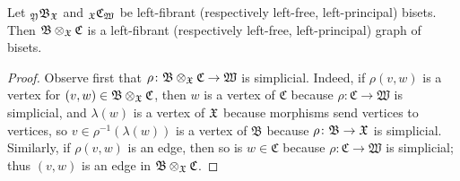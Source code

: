 \documentclass{amsart}
\begin{document}
\begin{lem}\label{lem:ProdOfFibrGrBis}
  Let ${}_{\mathfrak Y}\mathfrak B_{\mathfrak X}$ and
  ${}_{\mathfrak X}\mathfrak C_{\mathfrak W}$ be left-fibrant (respectively
  left-free, left-principal) bisets. Then
  $\mathfrak B\otimes_{\mathfrak X}\mathfrak C$ is a left-fibrant (respectively
  left-free, left-principal) graph of bisets.
\end{lem}
\begin{proof}
  Observe first that
  $\rho\colon \mathfrak B\otimes_{\mathfrak X}\mathfrak C\to \mathfrak W$ is
  simplicial. Indeed, if $\rho(v, w)$ is a vertex for
  $(v,w)\in \mathfrak B\otimes_{\mathfrak X}\mathfrak C$, then $w$ is a vertex
  of $\mathfrak C$ because $\rho\colon \mathfrak C\to \mathfrak W$ is
  simplicial, and $\lambda(w)$ is a vertex of ${\mathfrak X}$ because morphisms
  send vertices to vertices, so $v\in \rho^{-1}(\lambda(w))$ is a
  vertex of $\mathfrak B$ because $\rho\colon \mathfrak B\to {\mathfrak X}$ is
  simplicial. Similarly, if $\rho(v, w)$ is an edge, then so is $w\in \mathfrak C$ because $\rho \colon \mathfrak C\to \mathfrak W$ is simplicial; thus $(v,w)$ is an edge in $ \mathfrak B\otimes_{\mathfrak X}\mathfrak C$.



\end{proof}
\end{document}
